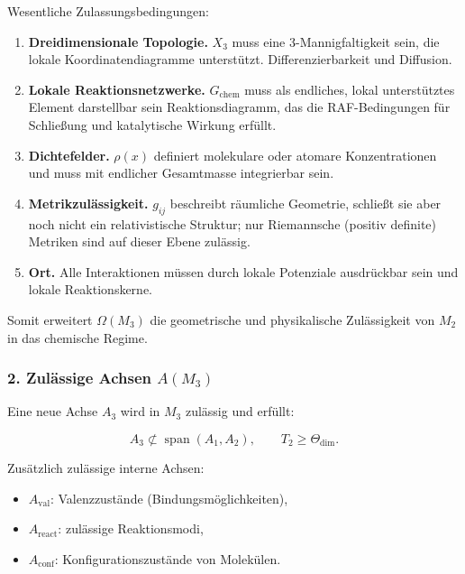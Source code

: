 Wesentliche Zulassungsbedingungen:

\begin{enumerate}
    \item \textbf{Dreidimensionale Topologie.}
    $X_3$ muss eine 3-Mannigfaltigkeit sein, die lokale Koordinatendiagramme unterstützt.
    Differenzierbarkeit und Diffusion.

    \item \textbf{Lokale Reaktionsnetzwerke.}
    $G_{\mathrm{chem}}$ muss als endliches, lokal unterstütztes Element darstellbar sein
    Reaktionsdiagramm, das die RAF-Bedingungen für Schließung und katalytische Wirkung erfüllt.

    \item \textbf{Dichtefelder.}
    $\rho(x)$ definiert molekulare oder atomare Konzentrationen
    und muss mit endlicher Gesamtmasse integrierbar sein.

    \item \textbf{Metrikzulässigkeit.}
    $g_{ij}$ beschreibt räumliche Geometrie, schließt sie aber noch nicht ein
    relativistische Struktur; nur Riemannsche (positiv definite) Metriken
    sind auf dieser Ebene zulässig.

    \item \textbf{Ort.}
    Alle Interaktionen müssen durch lokale Potenziale ausdrückbar sein
    und lokale Reaktionskerne.
\end{enumerate}

Somit erweitert $\Omega(M_3)$ die geometrische und physikalische Zulässigkeit von $M_2$
in das chemische Regime.

\subsubsection*{2. Zulässige Achsen \texorpdfstring{$A(M_3)$}{A(M_3)}}

Eine neue Achse $A_3$ wird in $M_3$ zulässig und erfüllt:

\[
A_3 \not\subset \operatorname{span}(A_1, A_2),
\qquad
T_2 \ge\Theta_{\mathrm{dim}}.
\]

Zusätzlich zulässige interne Achsen:

\begin{itemize}
    \item $A_{\mathrm{val}}$: Valenzzustände (Bindungsmöglichkeiten),
    \item $A_{\mathrm{react}}$: zulässige Reaktionsmodi,
    \item $A_{\mathrm{conf}}$: Konfigurationszustände von Molekülen.
\end{itemize}

